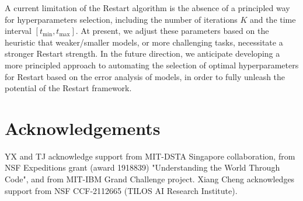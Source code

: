 \documentclass{article}
\newcommand{\tmin}{t_{\textrm{min}}}
\newcommand{\tmax}{t_{\textrm{max}}}
\begin{document}
A current limitation of the Restart algorithm is the absence of a principled way for hyperparameters selection, including the number of iterations $K$ and the time interval $[\tmin, \tmax]$. At present, we adjust these parameters based on the heuristic that weaker/smaller models, or more challenging tasks, necessitate a stronger Restart strength. In the future direction, we anticipate developing a more principled approach to automating the selection of optimal hyperparameters for Restart based on the error analysis of models, in order to fully unleash the potential of the Restart framework. 

\section*{Acknowledgements}

YX and TJ acknowledge support from MIT-DSTA Singapore collaboration, from NSF Expeditions grant (award 1918839) "Understanding the World Through Code", and from MIT-IBM Grand Challenge project. Xiang Cheng acknowledges support from NSF CCF-2112665 (TILOS AI Research Institute).

\clearpage


\newpage
\appendix

\end{document}
